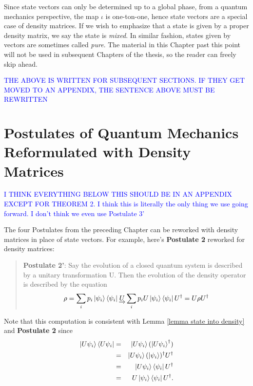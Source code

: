 Since state vectors can only be determined up to a global phase, from a quantum mechanics perspective, the map $\iota$ is one-ton-one, hence state vectors are a special case of density matrices.  If we wish to emphasize that a state is given by a proper density matrix, we say the state is \textit{mixed}.  In similar fashion, states given by vectors are sometimes called {\emph{pure}}.  The material in this Chapter past this point will not be used in subsequent Chapters of the thesis, so the reader can freely skip ahead.

\textcolor{blue}{THE ABOVE IS WRITTEN FOR SUBSEQUENT SECTIONS.  IF THEY GET MOVED TO AN APPENDIX, THE SENTENCE ABOVE MUST BE REWRITTEN}

\pagebreak

\section{Postulates of Quantum Mechanics Reformulated with Density Matrices}


\textcolor{blue}{I THINK EVERYTHING BELOW THIS SHOULD BE IN AN APPENDIX EXCEPT FOR THEOREM 2.  I think this is literally the only thing we use going forward.  I don't think we even use Postulate 3'}

The four Postulates from the preceding Chapter can be reworked with density matrices in place of state vectors. For example, here's \textbf{Postulate 2} reworked for density matrices:
\begin{quote}
    {\bf{Postulate 2'}}: Say the evolution of a closed quantum system is described by a unitary transformation U. Then the evolution of the density operator is described by the equation
    \begin{equation}
        \rho=\sum_i p_i \ket{\psi_i}\bra{\psi_i}	\underrightarrow{U}\sum_i p_i U \ket{\psi_i}\bra{\psi_i}U^\dagger=U \rho U^\dagger
    \end{equation}
\end{quote}

Note that this computation is consistent with Lemma \ref{lemma state into density} and {\bf{Postulate 2}} since
\begin{eqnarray}
\ket{U \psi_i}\bra{U \psi_i}&=& \ket{U \psi_i}(\ket{U \psi_i}^\dagger)\\
&=& \ket{U\psi_i}(\ket{\psi_i})^\dagger U^\dagger\\
&=& \ket{U \psi_i} \bra{\psi_i}U^\dagger\\
&=& U \ket{\psi_i}\bra{\psi_i}U^\dagger.
\end{eqnarray}

